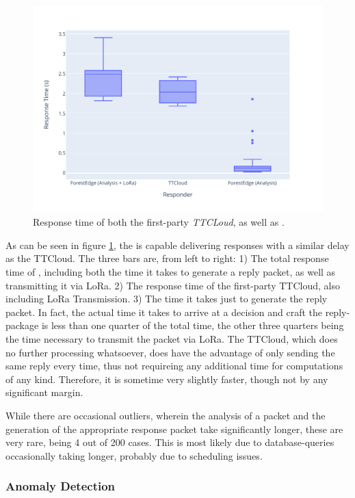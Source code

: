 \begin{figure}
    \centering
    \includegraphics[width=\linewidth]{figures/response_times.pdf}
    \caption{Response time of both the first-party \textit{TTCLoud}, as well as \textit{\ttt}.}
    \label{fig:evaluation:ttt_response}
\end{figure}

As can be seen in figure \ref{fig:evaluation:ttt_response}, the \ttt is capable delivering responses with a similar delay as the TTCloud.
The three bars are, from left to right: 1) The total response time of \ttt, including both the time it takes to generate a reply packet, as well as transmitting it via LoRa. 2) The response time of the first-party TTCloud, also including LoRa Transmission. 3) The time it takes \ttt just to generate the reply packet.
In fact, the actual time it takes to arrive at a decision and craft the reply-package is less than one quarter of the total time, the other three quarters being the time necessary to transmit the packet via LoRa.
The TTCloud, which does no further processing whatsoever, does have the advantage of only sending the same reply every time, thus not requireing any additional time for computations of any kind.
Therefore, it is sometime very slightly faster, though not by any significant margin.

While there are occasional outliers, wherein the analysis of a packet and the generation of the appropriate response packet take significantly longer, these are very rare, being 4 out of 200 cases.
This is most likely due to database-queries occasionally taking longer, probably due to scheduling issues.

\subsubsection{Anomaly Detection}
\label{sec:evaluation:anomaly-detection}

